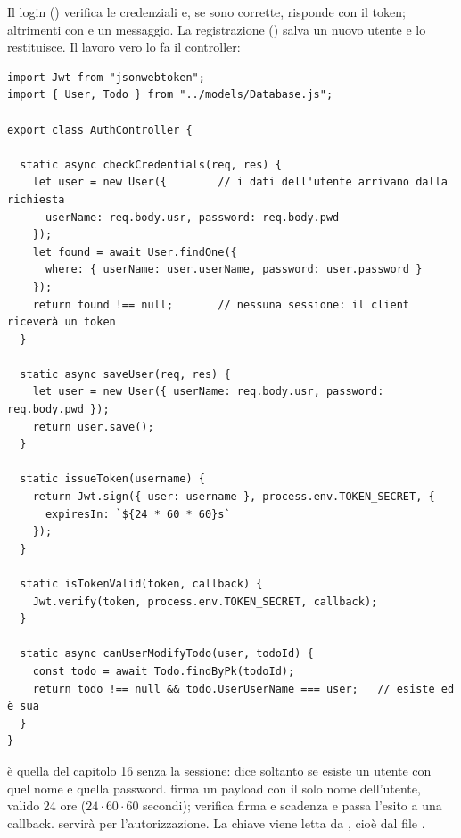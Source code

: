 Il login () verifica le credenziali e, se sono corrette,
risponde con il token; altrimenti con  e un messaggio. La
registrazione () salva un nuovo utente e lo restituisce.
Il lavoro vero lo fa il controller:

\begin{lstlisting}[style=js, name=controllers/AuthController.js]
import Jwt from "jsonwebtoken";
import { User, Todo } from "../models/Database.js";

export class AuthController {

  static async checkCredentials(req, res) {
    let user = new User({        // i dati dell'utente arrivano dalla richiesta
      userName: req.body.usr, password: req.body.pwd
    });
    let found = await User.findOne({
      where: { userName: user.userName, password: user.password }
    });
    return found !== null;       // nessuna sessione: il client riceverà un token
  }

  static async saveUser(req, res) {
    let user = new User({ userName: req.body.usr, password: req.body.pwd });
    return user.save();
  }

  static issueToken(username) {
    return Jwt.sign({ user: username }, process.env.TOKEN_SECRET, {
      expiresIn: `${24 * 60 * 60}s`
    });
  }

  static isTokenValid(token, callback) {
    Jwt.verify(token, process.env.TOKEN_SECRET, callback);
  }

  static async canUserModifyTodo(user, todoId) {
    const todo = await Todo.findByPk(todoId);
    return todo !== null && todo.UserUserName === user;   // esiste ed è sua
  }
}
\end{lstlisting}

\begin{affianco}[0.55][c]
 è quella del capitolo 16 senza la sessione: dice
soltanto se esiste un utente con quel nome e quella password.
 firma un payload con il solo nome dell'utente, valido 24 ore
($24 \cdot 60 \cdot 60$ secondi);  verifica firma e
scadenza e passa l'esito a una callback.  servirà per
l'autorizzazione. La chiave viene letta da , cioè dal file
.
\risultato
\begin{immagine}
\end{immagine}
\end{affianco}

